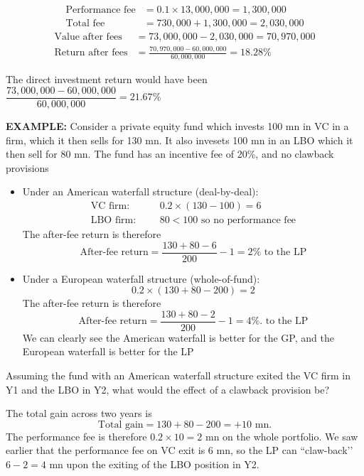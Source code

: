 \documentclass[../notes_compiled.tex]{subfiles}
\begin{document}
\begin{itemize}
{\begin{align*}
\text{Performance fee} &=0.1 \times 13,000,000 = 1,300,000 \\
\text{Total fee}&= 730,000 + 1,300,000 = 2,030,000
\end{align*}
\begin{align*}
\text{Value after fees} &= 73,000,000 - 2,030,000 = 70,970,000 \\
\text{Return after fees} &= \frac{70,970,000 - 60,000,000}{60,000,000} = 18.28\%
\end{align*}
\item[] The direct investment return would have been $\dfrac{73,000,000 - 60,000,000}{60,000,000}=21.67\%$
}
{\color{RedViolet}
\item[] \textbf{EXAMPLE:} Consider a private equity fund which invests 100 mn in VC in a firm, which it then sells for 130 mn. It also invesets 100 mn in an LBO which it then sell for 80 mn. The fund has an incentive fee of 20\%, and no clawback provisions
}
{\color{RoyalBlue}
\begin{itemize}
\item Under an American waterfall structure (deal-by-deal):
\begin{align*}
\text{VC firm:}& & &0.2\times (130-100) = 6 \\
\text{LBO firm:}& & &80 < 100 \text{ so no performance fee} 
\end{align*}
The after-fee return is therefore
\begin{equation*}
\text{After-fee return} = \frac{130 + 80 -6}{200} -1 = 2\% \text{ to the LP}
\end{equation*}
\item Under a European waterfall structure (whole-of-fund):
\begin{equation*}
0.2\times(130 + 80 - 200) = 2
\end{equation*}
The after-fee return is therefore
\begin{equation*}
\text{After-fee return} = \frac{130 + 80 - 2}{200}-1 = 4\%. \text{ to the LP}
\end{equation*}
We can clearly see the American waterfall is better for the GP, and the European waterfall is better for the LP
\end{itemize}
}
{\color{RedViolet}
\item[] Assuming the fund with an American waterfall structure exited the VC firm in Y1 and the LBO in Y2, what would the effect of a clawback provision be?
}
{\color{RoyalBlue}
\item[] The total gain across two years is
\begin{equation*}
\text{Total gain} = 130 + 80 - 200 = +10\text{ mn}.
\end{equation*}
The performance fee is therefore $0.2 \times 10 = 2$ mn on the whole portfolio. We saw earlier that the performance fee on VC exit is 6 mn, so the LP can ``claw-back’’ $6-2=4$ mn upon the exiting of the LBO position in Y2.
}
\end{itemize}
\end{document}
